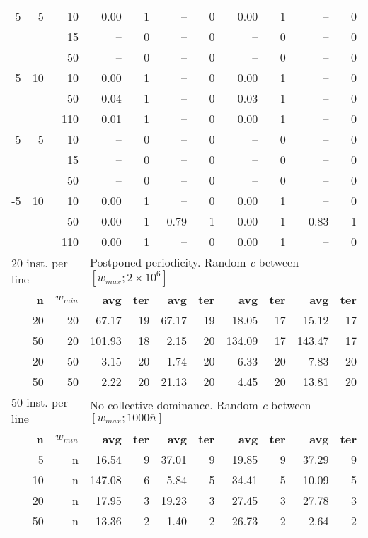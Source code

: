 \begin{table}
\begin{tabular}{@{\extracolsep{4pt}}rrrrrrrrrrr@{}}
\cline{1-3}\cline{4-5}\cline{6-7}\cline{8-9}\cline{10-11}
 5 & 5  & 10 & 0.00 & 1 &   -- & 0 & 0.00 & 1 &   -- & 0\\
   &    & 15 &   -- & 0 &   -- & 0 &   -- & 0 &   -- & 0\\
   &    & 50 &   -- & 0 &   -- & 0 &   -- & 0 &   -- & 0\\
 5 & 10 & 10 & 0.00 & 1 &   -- & 0 & 0.00 & 1 &   -- & 0\\
   &    & 50 & 0.04 & 1 &   -- & 0 & 0.03 & 1 &   -- & 0\\
   &    & 110& 0.01 & 1 &   -- & 0 & 0.00 & 1 &   -- & 0\\
-5 & 5  & 10 &   -- & 0 &   -- & 0 &   -- & 0 &   -- & 0\\
   &    & 15 &   -- & 0 &   -- & 0 &   -- & 0 &   -- & 0\\
   &    & 50 &   -- & 0 &   -- & 0 &   -- & 0 &   -- & 0\\
-5 & 10 & 10 & 0.00 & 1 &   -- & 0 & 0.00 & 1 &   -- & 0\\
   &    & 50 & 0.00 & 1 & 0.79 & 1 & 0.00 & 1 & 0.83 & 1\\
   &    & 110& 0.00 & 1 &   -- & 0 & 0.00 & 1 &   -- & 0\\
\hline

\multicolumn{3}{l}{20 inst. per line} & \multicolumn{8}{l}{Postponed periodicity. Random \emph{c} between \([w_{max}; 2\times10^6]\)}\\
\cline{1-3}\cline{4-11}
& \textbf{n} & \(w_{min}\) & \textbf{avg} & \textbf{ter}  & \textbf{avg} & \textbf{ter} & \textbf{avg} & \textbf{ter} & \textbf{avg} & \textbf{ter}\\
\cline{1-3}\cline{4-5}\cline{6-7}\cline{8-9}\cline{10-11}
& 20 & 20 &  67.17 & 19 & 67.17 & 19 &  18.05 & 17 &  15.12 & 17\\
& 50 & 20 & 101.93 & 18 &  2.15 & 20 & 134.09 & 17 & 143.47 & 17\\
& 20 & 50 &   3.15 & 20 &  1.74 & 20 &   6.33 & 20 &   7.83 & 20\\
& 50 & 50 &   2.22 & 20 & 21.13 & 20 &   4.45 & 20 &  13.81 & 20\\
\hline

\multicolumn{3}{l}{50 inst. per line} & \multicolumn{8}{l}{No collective dominance. Random \emph{c} between \([w_{max}; 1000\overline{n}]\)}\\
\cline{1-3}\cline{4-11}
& \textbf{n} & \(w_{min}\) & \textbf{avg} & \textbf{ter} & \textbf{avg} & \textbf{ter} & \textbf{avg} & \textbf{ter} & \textbf{avg} & \textbf{ter}\\
\cline{1-3}\cline{4-5}\cline{6-7}\cline{8-9}\cline{10-11}
&  5 & n &  16.54 & 9 & 37.01 & 9 & 19.85 & 9 & 37.29 & 9\\
& 10 & n & 147.08 & 6 &  5.84 & 5 & 34.41 & 5 & 10.09 & 5\\
& 20 & n &  17.95 & 3 & 19.23 & 3 & 27.45 & 3 & 27.78 & 3\\
& 50 & n &  13.36 & 2 &  1.40 & 2 & 26.73 & 2 &  2.64 & 2\\
\hline


\end{tabular}
\end{table}
